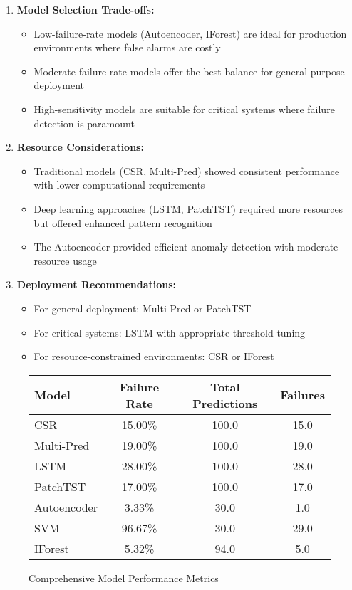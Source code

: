 \documentclass{article}
\begin{document}
\begin{enumerate}
    \item \textbf{Model Selection Trade-offs:}
    \begin{itemize}
        \item Low-failure-rate models (Autoencoder, IForest) are ideal for production environments where false alarms are costly
        \item Moderate-failure-rate models offer the best balance for general-purpose deployment
        \item High-sensitivity models are suitable for critical systems where failure detection is paramount
    \end{itemize}
    
    \item \textbf{Resource Considerations:}
    \begin{itemize}
        \item Traditional models (CSR, Multi-Pred) showed consistent performance with lower computational requirements
        \item Deep learning approaches (LSTM, PatchTST) required more resources but offered enhanced pattern recognition
        \item The Autoencoder provided efficient anomaly detection with moderate resource usage
    \end{itemize}
    
    \item \textbf{Deployment Recommendations:}
    \begin{itemize}
        \item For general deployment: Multi-Pred or PatchTST
        \item For critical systems: LSTM with appropriate threshold tuning
        \item For resource-constrained environments: CSR or IForest
    \end{itemize}
\end{enumerate}

\begin{figure}[!htb]
\centering
\begin{tabular}{|l|c|c|c|}
\hline
\textbf{Model} & \textbf{Failure Rate} & \textbf{Total Predictions} & \textbf{Failures} \\
\hline
CSR & 15.00\% & 100.0 & 15.0 \\
Multi-Pred & 19.00\% & 100.0 & 19.0 \\
LSTM & 28.00\% & 100.0 & 28.0 \\
PatchTST & 17.00\% & 100.0 & 17.0 \\
Autoencoder & 3.33\% & 30.0 & 1.0 \\
SVM & 96.67\% & 30.0 & 29.0 \\
IForest & 5.32\% & 94.0 & 5.0 \\
\hline
\end{tabular}
\caption{Comprehensive Model Performance Metrics}
\label{tab:model-metrics}
\end{figure}
\end{document}
